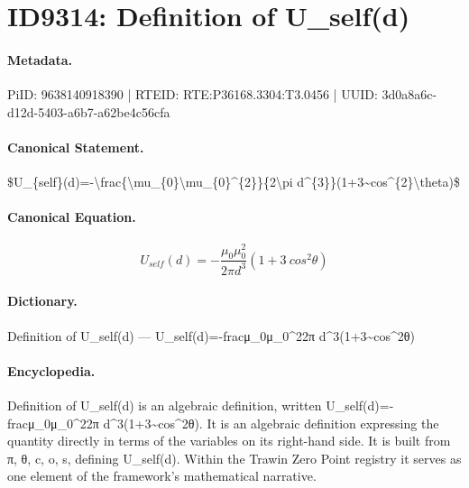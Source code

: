 \section*{ID9314: Definition of U\_self(d)}
\paragraph{Metadata.}
PiID: 9638140918390 | RTEID: RTE:P36168.3304:T3.0456 | UUID: 3d0a8a6c-d12d-5403-a6b7-a62be4c56cfa

\paragraph{Canonical Statement.}
\$U\_\{self\}(d)=-\textbackslash{}frac\{\textbackslash{}mu\_\{0\}\textbackslash{}mu\_\{0\}\textasciicircum{}\{2\}\}\{2\textbackslash{}pi d\textasciicircum{}\{3\}\}(1+3\textasciitilde{}cos\textasciicircum{}\{2\}\textbackslash{}theta)\$

\paragraph{Canonical Equation.}
\[
U_{self}(d)=-\frac{\mu_{0}\mu_{0}^{2}}{2\pi d^{3}}(1+3~cos^{2}\theta)
\]

\paragraph{Dictionary.}
Definition of U\_self(d) — U\_self(d)=-fracμ\_0μ\_0\textasciicircum{}22π d\textasciicircum{}3(1+3\textasciitilde{}cos\textasciicircum{}2θ)

\paragraph{Encyclopedia.}
Definition of U\_self(d) is an algebraic definition, written U\_self(d)=-fracμ\_0μ\_0\textasciicircum{}22π d\textasciicircum{}3(1+3\textasciitilde{}cos\textasciicircum{}2θ). It is an algebraic definition expressing the quantity directly in terms of the variables on its right-hand side. It is built from π, θ, c, o, s, defining U\_self(d). Within the Trawin Zero Point registry it serves as one element of the framework's mathematical narrative.
